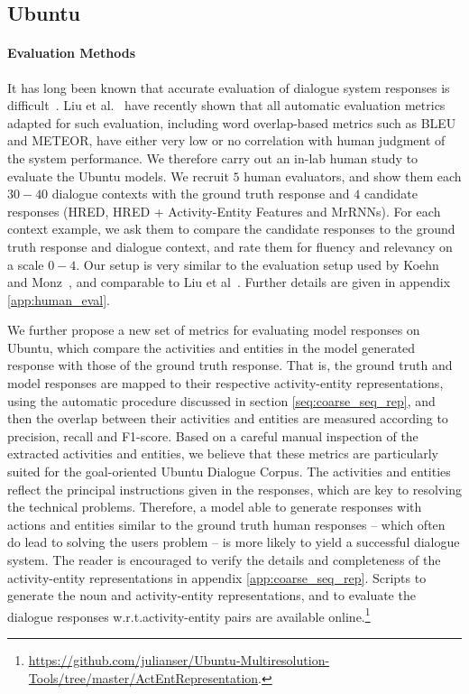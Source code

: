 \documentclass{article}
\begin{document}
\subsection{Ubuntu}

\paragraph{Evaluation Methods}
It has long been known that accurate evaluation of dialogue system responses is difficult~\cite{schatzmann2005quantitative}.
Liu et al.~\cite{liu2016not} have recently shown that all automatic evaluation metrics adapted for such evaluation, including word overlap-based metrics such as BLEU and METEOR, have either very low or no correlation with human judgment of the system performance.
We therefore carry out an in-lab human study to evaluate the Ubuntu models.
We recruit $5$ human evaluators, and show them each $30-40$ dialogue contexts with the ground truth response and $4$ candidate responses (HRED, HRED + Activity-Entity Features and MrRNNs).
For each context example, we ask them to compare the candidate responses to the ground truth response and dialogue context,
and rate them for fluency and relevancy on a scale $0-4$.
Our setup is very similar to the evaluation setup used by Koehn and Monz~\cite{koehn2006manual}, and comparable to Liu et al~\cite{liu2016not}.
Further details are given in appendix \ref{app:human_eval}.

We further propose a new set of metrics for evaluating model responses on Ubuntu, which compare the activities and entities in the model generated response with those of the ground truth response.
That is, the ground truth and model responses are mapped to their respective activity-entity representations, using the automatic procedure discussed in section \ref{seq:coarse_seq_rep},
and then the overlap between their activities and entities are measured according to precision, recall and F1-score.
Based on a careful manual inspection of the extracted activities and entities, we believe that these metrics are particularly suited for the goal-oriented Ubuntu Dialogue Corpus. 
The activities and entities reflect the principal instructions given in the responses, which are key to resolving the technical problems.
Therefore, a model able to generate responses with actions and entities similar to the ground truth human responses -- which often do lead to solving the users problem -- is more likely to yield a successful dialogue system.
The reader is encouraged to verify the details and completeness of the activity-entity representations in appendix \ref{app:coarse_seq_rep}.
Scripts to generate the noun and activity-entity representations, and to evaluate the dialogue responses w.r.t.\@ activity-entity pairs are available online.\footnote{\url{https://github.com/julianser/Ubuntu-Multiresolution-Tools/tree/master/ActEntRepresentation}.}
\end{document}
